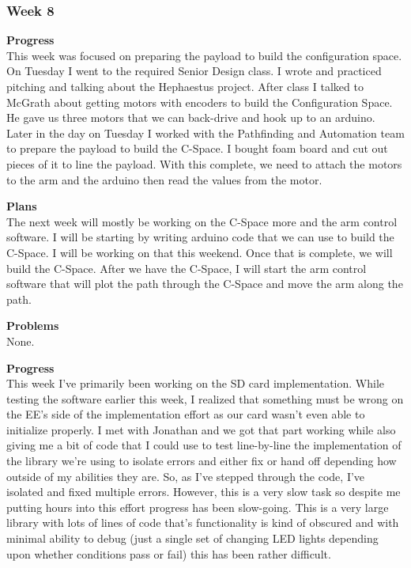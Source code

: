 \subsubsection{Week 8}
\textbf{Progress} \\ 
This week was focused on preparing the payload to build the configuration space. On Tuesday I went to the required Senior Design class. I wrote and practiced pitching and talking about the Hephaestus project. After class I talked to McGrath about getting motors with encoders to build the Configuration Space. He gave us three motors that we can back-drive and hook up to an arduino. Later in the day on Tuesday I worked with the Pathfinding and Automation team to prepare the payload to build the C-Space. I bought foam board and cut out pieces of it to line the payload. With this complete, we need to attach the motors to the arm and the arduino then read the values from the motor.

\textbf{Plans} \\ 
The next week will mostly be working on the C-Space more and the arm control software. I will be starting by writing arduino code that we can use to build the C-Space. I will be working on that this weekend. Once that is complete, we will build the C-Space. After we have the C-Space, I will start the arm control software that will plot the path through the C-Space and move the arm along the path.

\textbf{Problems} \\ 
None.

\textbf{Progress} \\ 
This week I've primarily been working on the SD card implementation. While testing the software earlier this week, I realized that something must be 
wrong on the EE's side of the implementation effort as our card wasn't even able to initialize properly. I met with Jonathan and we got that part working 
while also giving me a bit of code that I could use to test line-by-line the implementation of the library we're using to isolate errors and either fix 
or hand off depending how outside of my abilities they are. So, as I've stepped through the code, I've isolated and fixed multiple errors. However, this 
is a very slow task so despite me putting hours into this effort progress has been slow-going. This is a very large library with lots of lines of code 
that's functionality is kind of obscured and with minimal ability to debug (just a single set of changing LED lights depending upon whether conditions 
pass or fail) this has been rather difficult.

